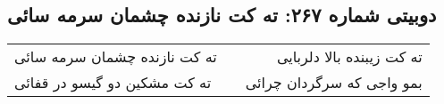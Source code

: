 \begin{center}
\section*{دوبیتی شماره ۲۶۷: ته کت نازنده چشمان سرمه سائی}
\label{sec:267}
\begin{longtable}{l p{0.5cm} r}
ته کت نازنده چشمان سرمه سائی
&&
ته کت زیبنده بالا دلربایی
\\
ته کت مشکین دو گیسو در قفائی
&&
بمو واجی که سرگردان چرائی
\\
\end{longtable}
\end{center}
